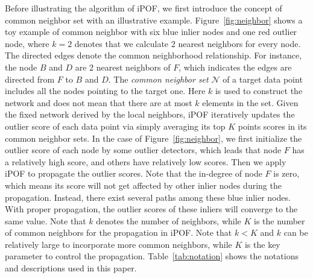 \documentclass[sigconf,nonacm]{acmart}
\begin{document}
Before illustrating the algorithm of iPOF, we first introduce the concept of common neighbor set with an illustrative example. Figure\textcolor{red}{~\ref{fig:neighbor}} shows a toy example of common neighbor with six blue inlier nodes and one red outlier node, where $k=2$ denotes that we calculate 2 nearest neighbors for every node. The directed edges denote the common neighborhood relationship. For instance, the node $B$ and $D$ are 2 nearest neighbors of $F$, which indicates the edges are directed from $F$ to $B$ and $D$. The \textit{common neighbor set} $\mathcal{N}$ of a target data point includes all the nodes pointing to the target one. Here $k$ is used to construct the network and does not mean that there are at most $k$ elements in the set. Given the fixed network derived by the local neighbors, iPOF iteratively updates the outlier score of each data point via simply averaging its top $K$ points scores in its common neighbor sets. In the case of Figure\textcolor{red}{~\ref{fig:neighbor}}, we first initialize the outlier score of each node by some outlier detectors, which leads that node $F$ has a relatively high score, and others have relatively low scores. Then we apply iPOF to propagate the outlier scores. Note that the in-degree of node $F$ is zero, which means its score will not get affected by other inlier nodes during the propagation. Instead, there exist several paths among these blue inlier nodes. With proper propagation, the outlier scores of these inliers will converge to the same value. Note that $k$ denotes the number of neighbors, while $K$ is the number of common neighbors for the propagation in iPOF. Note that $k<K$ and $k$ can be relatively large to incorporate more common neighbors, while $K$ is the key parameter to control the propagation. Table~\ref{tab:notation} shows the notations and descriptions used in this paper.

\end{document}
